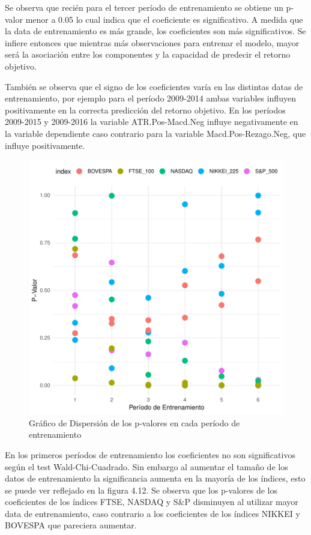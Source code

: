 \documentclass[a4paper,12pt]{Latex/Classes/PhDthesisPSnPDF}
\begin{document}
Se observa que recién para el tercer período de entrenamiento se obtiene un p-valor menor a 0.05 lo cual indica que el coeficiente es significativo. A medida que la data de entrenamiento es más grande, los coeficientes son más significativos. Se infiere entonces que mientras más observaciones para entrenar el modelo, mayor será la asociación entre los componentes y la capacidad de predecir el retorno objetivo.

También se observa que el signo de los coeficientes varía en las distintas datas de entrenamiento, por ejemplo para el período 2009-2014 ambas variables influyen positivamente en la correcta predicción del retorno objetivo. En los períodos 2009-2015 y 2009-2016 la variable ATR.Pos-Macd.Neg influye negativamente en la variable dependiente caso contrario para la variable Macd.Pos-Rezago.Neg, que influye positivamente.


\begin{figure}[H]
\centering
\includegraphics{main-027}
\caption{Gráfico de Dispersión de los p-valores en cada período de entrenamiento}
\end{figure}

En los primeros períodos de entrenamiento los coeficientes no son significativos según el test Wald-Chi-Cuadrado. Sin embargo al aumentar el tamaño de los datos de entrenamiento la significancia aumenta en la mayoría de los índices, esto se puede ver reflejado en la figura 4.12. Se observa que los p-valores de los coeficientes de los índices FTSE, NASDAQ y S\&P disminuyen al utilizar mayor data de entrenamiento, caso contrario a los coeficientes de los índices NIKKEI y BOVESPA que pareciera aumentar.
\end{document}
